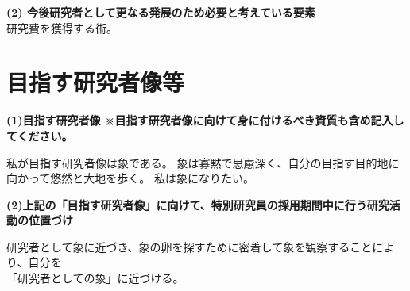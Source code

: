 \documentclass[11pt,a4j,dvipdfmx]{jarticle} 					%
\newcommand{\研究課題名}{象の卵}
\newcommand{\研究機関名}{逢坂大学}
\newcommand{\研究代表者氏名}{湯川秀樹}
\begin{document}
\vspace{5mm}
\noindent
\textbf{(2) 今後研究者として更なる発展のため必要と考えている要素}\\
研究費を獲得する術。




\section{目指す研究者像等}

\noindent
\textbf{(1)目指す研究者像 {\scriptsize ※目指す研究者像に向けて身に付けるべき資質も含め記入してください。}}

私が目指す研究者像は象である。
象は寡黙で思慮深く、自分の目指す目的地に向かって悠然と大地を歩く。
私は象になりたい。

\vspace{5mm}
\noindent
\textbf{(2)上記の「目指す研究者像」に向けて、特別研究員の採用期間中に行う研究活動の位置づけ}

研究者として象に近づき、象の卵を探すために密着して象を観察することにより、自分を\\
「研究者としての象」に近づける。



\end{document}
